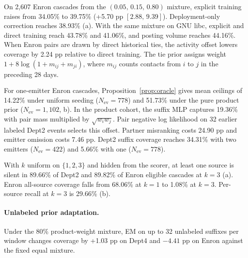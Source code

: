 On 2,607 Enron cascades from the $(0.05,\,0.15,\,0.80)$ mixture, explicit training raises \both{} from 34.05\% to 39.75\% (+5.70 pp $[2.88,\,9.39]$). Deployment-only correction reaches 38.93\% (a). With the same mixture on GNU libc, explicit and direct training reach 43.78\% and 41.06\%, and posting volume reaches 44.16\%. When Enron pairs are drawn by direct historical ties, the activity offset lowers coverage by 2.24 pp relative to direct training. The tie prior assigns weight $1+8\log(1+m_{ij}+m_{ji})$, where $m_{ij}$ counts contacts from $i$ to $j$ in the preceding 28 days.

For one-emitter Enron cascades, Proposition~\ref{prop:oracle} gives mean ceilings of 14.22\% under uniform seeding ($N_{\mathrm{ev}}=778$) and 51.73\% under the pure product prior ($N_{\mathrm{ev}}=1{,}102$, b). In the product cohort, the suffix MLP captures 19.36\% with pair mass multiplied by $\sqrt{w_iw_j}$. Pair negative log likelihood on 32 earlier labeled Dept2 events selects this offset. Partner misranking costs 24.90 pp and emitter omission costs 7.46 pp. Dept2 suffix coverage reaches 34.31\% with two emitters ($N_{\mathrm{ev}}=422$) and 5.66\% with one ($N_{\mathrm{ev}}=778$).

With $k$ uniform on $\{1,2,3\}$ and hidden from the scorer, at least one source is silent in 89.66\% of Dept2 and 89.82\% of Enron eligible cascades at $k=3$ (a). Enron all-source coverage falls from 68.06\% at $k=1$ to 1.08\% at $k=3$. Per-source recall at $k=3$ is 29.66\% (b).

\paragraph{Unlabeled prior adaptation.}
Under the 80\% product-weight mixture, EM on up to 32 unlabeled suffixes per window changes coverage by +1.03 pp on Dept4 and $-4.41$ pp on Enron against the fixed equal mixture.


